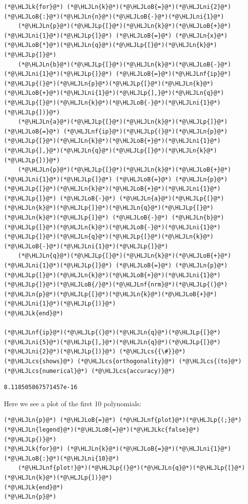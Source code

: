 \documentclass[12pt,a4paper]{article}
\newcommand{\HLJLk}[1]{\textcolor[RGB]{148,91,176}{\textbf{#1}}}
\newcommand{\HLJLkc}[1]{\textcolor[RGB]{59,151,46}{\textit{#1}}}
\newcommand{\HLJLn}[1]{#1}
\newcommand{\HLJLnf}[1]{\textcolor[RGB]{66,102,213}{#1}}
\newcommand{\HLJLni}[1]{\textcolor[RGB]{59,151,46}{#1}}
\newcommand{\HLJLoB}[1]{\textcolor[RGB]{102,102,102}{\textbf{#1}}}
\newcommand{\HLJLp}[1]{#1}
\newcommand{\HLJLcs}[1]{\textcolor[RGB]{153,153,119}{\textit{#1}}}
\begin{document}
\begin{lstlisting}
(*@\HLJLk{for}@*) (*@\HLJLn{k}@*)(*@\HLJLoB{=}@*)(*@\HLJLni{2}@*)(*@\HLJLoB{:}@*)(*@\HLJLn{n}@*)(*@\HLJLoB{-}@*)(*@\HLJLni{1}@*)
    (*@\HLJLn{p}@*)(*@\HLJLp{[}@*)(*@\HLJLn{k}@*)(*@\HLJLoB{+}@*)(*@\HLJLni{1}@*)(*@\HLJLp{]}@*) (*@\HLJLoB{=}@*) (*@\HLJLn{x}@*)(*@\HLJLoB{*}@*)(*@\HLJLn{q}@*)(*@\HLJLp{[}@*)(*@\HLJLn{k}@*)(*@\HLJLp{]}@*)
    (*@\HLJLn{b}@*)(*@\HLJLp{[}@*)(*@\HLJLn{k}@*)(*@\HLJLoB{-}@*)(*@\HLJLni{1}@*)(*@\HLJLp{]}@*) (*@\HLJLoB{=}@*)(*@\HLJLnf{ip}@*)(*@\HLJLp{(}@*)(*@\HLJLn{p}@*)(*@\HLJLp{[}@*)(*@\HLJLn{k}@*)(*@\HLJLoB{+}@*)(*@\HLJLni{1}@*)(*@\HLJLp{],}@*)(*@\HLJLn{q}@*)(*@\HLJLp{[}@*)(*@\HLJLn{k}@*)(*@\HLJLoB{-}@*)(*@\HLJLni{1}@*)(*@\HLJLp{])}@*)
    (*@\HLJLn{a}@*)(*@\HLJLp{[}@*)(*@\HLJLn{k}@*)(*@\HLJLp{]}@*) (*@\HLJLoB{=}@*) (*@\HLJLnf{ip}@*)(*@\HLJLp{(}@*)(*@\HLJLn{p}@*)(*@\HLJLp{[}@*)(*@\HLJLn{k}@*)(*@\HLJLoB{+}@*)(*@\HLJLni{1}@*)(*@\HLJLp{],}@*)(*@\HLJLn{q}@*)(*@\HLJLp{[}@*)(*@\HLJLn{k}@*)(*@\HLJLp{])}@*)
    (*@\HLJLn{p}@*)(*@\HLJLp{[}@*)(*@\HLJLn{k}@*)(*@\HLJLoB{+}@*)(*@\HLJLni{1}@*)(*@\HLJLp{]}@*) (*@\HLJLoB{=}@*) (*@\HLJLn{p}@*)(*@\HLJLp{[}@*)(*@\HLJLn{k}@*)(*@\HLJLoB{+}@*)(*@\HLJLni{1}@*)(*@\HLJLp{]}@*) (*@\HLJLoB{-}@*) (*@\HLJLn{a}@*)(*@\HLJLp{[}@*)(*@\HLJLn{k}@*)(*@\HLJLp{]}@*)(*@\HLJLn{q}@*)(*@\HLJLp{[}@*)(*@\HLJLn{k}@*)(*@\HLJLp{]}@*) (*@\HLJLoB{-}@*) (*@\HLJLn{b}@*)(*@\HLJLp{[}@*)(*@\HLJLn{k}@*)(*@\HLJLoB{-}@*)(*@\HLJLni{1}@*)(*@\HLJLp{]}@*)(*@\HLJLn{q}@*)(*@\HLJLp{[}@*)(*@\HLJLn{k}@*)(*@\HLJLoB{-}@*)(*@\HLJLni{1}@*)(*@\HLJLp{]}@*)
    (*@\HLJLn{q}@*)(*@\HLJLp{[}@*)(*@\HLJLn{k}@*)(*@\HLJLoB{+}@*)(*@\HLJLni{1}@*)(*@\HLJLp{]}@*) (*@\HLJLoB{=}@*) (*@\HLJLn{p}@*)(*@\HLJLp{[}@*)(*@\HLJLn{k}@*)(*@\HLJLoB{+}@*)(*@\HLJLni{1}@*)(*@\HLJLp{]}@*)(*@\HLJLoB{/}@*)(*@\HLJLnf{nrm}@*)(*@\HLJLp{(}@*)(*@\HLJLn{p}@*)(*@\HLJLp{[}@*)(*@\HLJLn{k}@*)(*@\HLJLoB{+}@*)(*@\HLJLni{1}@*)(*@\HLJLp{])}@*)
(*@\HLJLk{end}@*)

(*@\HLJLnf{ip}@*)(*@\HLJLp{(}@*)(*@\HLJLn{q}@*)(*@\HLJLp{[}@*)(*@\HLJLni{5}@*)(*@\HLJLp{],}@*)(*@\HLJLn{q}@*)(*@\HLJLp{[}@*)(*@\HLJLni{2}@*)(*@\HLJLp{])}@*) (*@\HLJLcs{{\#}}@*) (*@\HLJLcs{shows}@*) (*@\HLJLcs{orthogonality}@*) (*@\HLJLcs{(to}@*) (*@\HLJLcs{numerical}@*) (*@\HLJLcs{accuracy)}@*)
\end{lstlisting}

\begin{lstlisting}
8.118505867571457e-16
\end{lstlisting}


Here we see a plot of the first 10 polynomials:


\begin{lstlisting}
(*@\HLJLn{p}@*) (*@\HLJLoB{=}@*) (*@\HLJLnf{plot}@*)(*@\HLJLp{(;}@*) (*@\HLJLn{legend}@*)(*@\HLJLoB{=}@*)(*@\HLJLkc{false}@*)(*@\HLJLp{)}@*)
(*@\HLJLk{for}@*) (*@\HLJLn{k}@*)(*@\HLJLoB{=}@*)(*@\HLJLni{1}@*)(*@\HLJLoB{:}@*)(*@\HLJLni{10}@*)
    (*@\HLJLnf{plot!}@*)(*@\HLJLp{(}@*)(*@\HLJLn{q}@*)(*@\HLJLp{[}@*)(*@\HLJLn{k}@*)(*@\HLJLp{])}@*)
(*@\HLJLk{end}@*)
(*@\HLJLn{p}@*)
\end{lstlisting}
\end{document}
